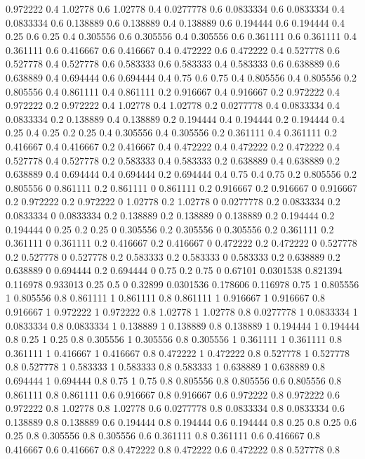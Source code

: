 0.972222 0.4
1.02778 0.6
1.02778 0.4
0.0277778 0.6
0.0833334 0.6
0.0833334 0.4
0.0833334 0.6
0.138889 0.6
0.138889 0.4
0.138889 0.6
0.194444 0.6
0.194444 0.4
0.25 0.6
0.25 0.4
0.305556 0.6
0.305556 0.4
0.305556 0.6
0.361111 0.6
0.361111 0.4
0.361111 0.6
0.416667 0.6
0.416667 0.4
0.472222 0.6
0.472222 0.4
0.527778 0.6
0.527778 0.4
0.527778 0.6
0.583333 0.6
0.583333 0.4
0.583333 0.6
0.638889 0.6
0.638889 0.4
0.694444 0.6
0.694444 0.4
0.75 0.6
0.75 0.4
0.805556 0.4
0.805556 0.2
0.805556 0.4
0.861111 0.4
0.861111 0.2
0.916667 0.4
0.916667 0.2
0.972222 0.4
0.972222 0.2
0.972222 0.4
1.02778 0.4
1.02778 0.2
0.0277778 0.4
0.0833334 0.4
0.0833334 0.2
0.138889 0.4
0.138889 0.2
0.194444 0.4
0.194444 0.2
0.194444 0.4
0.25 0.4
0.25 0.2
0.25 0.4
0.305556 0.4
0.305556 0.2
0.361111 0.4
0.361111 0.2
0.416667 0.4
0.416667 0.2
0.416667 0.4
0.472222 0.4
0.472222 0.2
0.472222 0.4
0.527778 0.4
0.527778 0.2
0.583333 0.4
0.583333 0.2
0.638889 0.4
0.638889 0.2
0.638889 0.4
0.694444 0.4
0.694444 0.2
0.694444 0.4
0.75 0.4
0.75 0.2
0.805556 0.2
0.805556 0
0.861111 0.2
0.861111 0
0.861111 0.2
0.916667 0.2
0.916667 0
0.916667 0.2
0.972222 0.2
0.972222 0
1.02778 0.2
1.02778 0
0.0277778 0.2
0.0833334 0.2
0.0833334 0
0.0833334 0.2
0.138889 0.2
0.138889 0
0.138889 0.2
0.194444 0.2
0.194444 0
0.25 0.2
0.25 0
0.305556 0.2
0.305556 0
0.305556 0.2
0.361111 0.2
0.361111 0
0.361111 0.2
0.416667 0.2
0.416667 0
0.472222 0.2
0.472222 0
0.527778 0.2
0.527778 0
0.527778 0.2
0.583333 0.2
0.583333 0
0.583333 0.2
0.638889 0.2
0.638889 0
0.694444 0.2
0.694444 0
0.75 0.2
0.75 0
0.67101 0.0301538
0.821394 0.116978
0.933013 0.25
0.5 0
0.32899 0.0301536
0.178606 0.116978
0.75 1
0.805556 1
0.805556 0.8
0.861111 1
0.861111 0.8
0.861111 1
0.916667 1
0.916667 0.8
0.916667 1
0.972222 1
0.972222 0.8
1.02778 1
1.02778 0.8
0.0277778 1
0.0833334 1
0.0833334 0.8
0.0833334 1
0.138889 1
0.138889 0.8
0.138889 1
0.194444 1
0.194444 0.8
0.25 1
0.25 0.8
0.305556 1
0.305556 0.8
0.305556 1
0.361111 1
0.361111 0.8
0.361111 1
0.416667 1
0.416667 0.8
0.472222 1
0.472222 0.8
0.527778 1
0.527778 0.8
0.527778 1
0.583333 1
0.583333 0.8
0.583333 1
0.638889 1
0.638889 0.8
0.694444 1
0.694444 0.8
0.75 1
0.75 0.8
0.805556 0.8
0.805556 0.6
0.805556 0.8
0.861111 0.8
0.861111 0.6
0.916667 0.8
0.916667 0.6
0.972222 0.8
0.972222 0.6
0.972222 0.8
1.02778 0.8
1.02778 0.6
0.0277778 0.8
0.0833334 0.8
0.0833334 0.6
0.138889 0.8
0.138889 0.6
0.194444 0.8
0.194444 0.6
0.194444 0.8
0.25 0.8
0.25 0.6
0.25 0.8
0.305556 0.8
0.305556 0.6
0.361111 0.8
0.361111 0.6
0.416667 0.8
0.416667 0.6
0.416667 0.8
0.472222 0.8
0.472222 0.6
0.472222 0.8
0.527778 0.8
